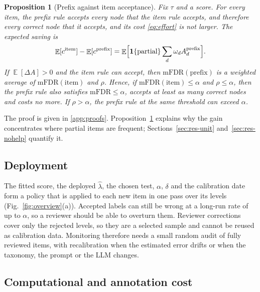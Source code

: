 \documentclass[preprint,12pt]{elsarticle}
\newtheorem{proposition}{Proposition}
\theoremstyle{definition}
\newcommand{\fdr}{\mathrm{mFDR}}
\DeclareMathOperator{\E}{\mathbb{E}}
\begin{document}
\begin{proposition}[Prefix against item acceptance]
\label{prop:prefix}
Fix $\tau$ and a score. For every item, the prefix rule accepts every node that the
item rule accepts, and therefore every correct node that it accepts, and
its cost \eqref{eq:effort} is not larger. The expected saving is
\begin{equation}
  \E[c^{\mathrm{item}}]-\E[c^{\mathrm{prefix}}]
  =\E\Bigl[\mathbf{1}\{\text{partial}\}\sum_d\omega_d A^{\mathrm{prefix}}_{d}\Bigr].
  \label{eq:saving}
\end{equation}
If $\E[\Delta A]>0$ and the item rule can accept, then $\fdr(\mathrm{prefix})$ is a
weighted average of $\fdr(\mathrm{item})$ and $\rho$. Hence, if
$\fdr(\mathrm{item})\le\alpha$ and $\rho\le\alpha$, then the prefix rule also
satisfies $\fdr\le\alpha$, accepts at least as many correct nodes and costs no
more. If $\rho>\alpha$, the prefix rule at the same threshold can exceed $\alpha$.
\end{proposition}

The proof is given in \ref{app:proofs}. Proposition~\ref{prop:prefix} explains
why the gain concentrates where partial items are frequent;
Sections~\ref{sec:res-unit} and~\ref{sec:res-nohelp} quantify it.

\subsection{Deployment}
\label{sec:method-system}

The fitted score, the deployed $\hat\lambda$, the chosen test, $\alpha$, $\delta$ and
the calibration date form a policy that is applied to each new item in one pass over
its levels (Fig.~\ref{fig:overview}(a)). Accepted labels can still be wrong at a
long-run rate of up to $\alpha$, so a reviewer should be able to overturn them.
Reviewer corrections cover only the rejected levels, so they are a selected sample
and cannot be reused as calibration data. Monitoring therefore needs a small random
audit of fully reviewed items, with recalibration when the estimated error drifts or
when the taxonomy, the prompt or the LLM changes.

\subsection{Computational and annotation cost}
\label{sec:method-cost}
\end{document}

